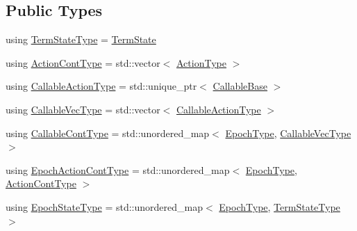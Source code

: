 \subsection*{Public Types}
\begin{DoxyCompactItemize}
\item 
using \hyperlink{structvt_1_1term_1_1_term_action_ae4c635b69751d887666814700ed64d65}{Term\+State\+Type} = \hyperlink{structvt_1_1term_1_1_term_state}{Term\+State}
\item 
using \hyperlink{structvt_1_1term_1_1_term_action_a3b7ff49ce82fc33a7a1ebda8797c02b7}{Action\+Cont\+Type} = std\+::vector$<$ \hyperlink{namespacevt_ae0a5a7b18cc99d7b732cb4d44f46b0f3}{Action\+Type} $>$
\item 
using \hyperlink{structvt_1_1term_1_1_term_action_aa4a32326730b20530526e1db6512c017}{Callable\+Action\+Type} = std\+::unique\+\_\+ptr$<$ \hyperlink{structvt_1_1term_1_1_callable_base}{Callable\+Base} $>$
\item 
using \hyperlink{structvt_1_1term_1_1_term_action_ad9e499fefd57d3bea8e0cae68a6b7f61}{Callable\+Vec\+Type} = std\+::vector$<$ \hyperlink{structvt_1_1term_1_1_term_action_aa4a32326730b20530526e1db6512c017}{Callable\+Action\+Type} $>$
\item 
using \hyperlink{structvt_1_1term_1_1_term_action_a802aaa899ce87dc9f8a53d43b202044c}{Callable\+Cont\+Type} = std\+::unordered\+\_\+map$<$ \hyperlink{namespacevt_a81d11b28122d43bf9834577e4a06440f}{Epoch\+Type}, \hyperlink{structvt_1_1term_1_1_term_action_ad9e499fefd57d3bea8e0cae68a6b7f61}{Callable\+Vec\+Type} $>$
\item 
using \hyperlink{structvt_1_1term_1_1_term_action_acefe3cb1e2a2bcf0d530082f53a2bada}{Epoch\+Action\+Cont\+Type} = std\+::unordered\+\_\+map$<$ \hyperlink{namespacevt_a81d11b28122d43bf9834577e4a06440f}{Epoch\+Type}, \hyperlink{structvt_1_1term_1_1_term_action_a3b7ff49ce82fc33a7a1ebda8797c02b7}{Action\+Cont\+Type} $>$
\item 
using \hyperlink{structvt_1_1term_1_1_term_action_afcbc07a9b40ff2b6d53e9522877a745d}{Epoch\+State\+Type} = std\+::unordered\+\_\+map$<$ \hyperlink{namespacevt_a81d11b28122d43bf9834577e4a06440f}{Epoch\+Type}, \hyperlink{structvt_1_1term_1_1_term_action_ae4c635b69751d887666814700ed64d65}{Term\+State\+Type} $>$
\end{DoxyCompactItemize}
